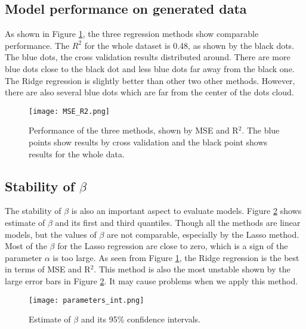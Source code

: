 \documentclass[a4paper]{article}
\begin{document}
\subsection{Model performance on generated data}
As shown in Figure \ref{figMSE_R2}, the three regression methods show comparable performance. The $R^2$ for the whole dataset is 0.48, as shown by the black dots. The blue dots, the cross validation results distributed around. There are more blue dots close to the black dot and less blue dots far away from the black one. The Ridge regression is slightly better than other two other methods. However, there are also several blue dots which are far from the center of the dots cloud.
\begin{figure}[H]
\centering
\texttt{[image: MSE\_R2.png]}
\caption{Performance of the three methods, shown by MSE and R$^{2}$. The blue points show results by cross validation and the black point shows results for the whole data.}
\label{figMSE_R2}
\end{figure}

\subsection{Stability of $\beta$}
The stability of $\beta$ is also an important aspect to evaluate models. Figure \ref{figStability} shows estimate of $\beta$ and its first and third quantiles. Though all the methods are linear models, but the values of $\beta$ are not comparable, especially by the Lasso method. Most of the $\beta$ for the Lasso regression are close to zero, which is a sign of the parameter $\alpha$ is too large. As seen from Figure \ref{figMSE_R2}, the Ridge regression is the best in terms of MSE and R$^{2}$. This method is also the most unstable shown by the large error bars in Figure \ref{figStability}. It may cause problems when we apply this method.
\begin{figure}[H]
\centering
\texttt{[image: parameters\_int.png]}\label{figParameter}
\caption{Estimate of $\beta$ and its 95\% confidence intervals.}
\label{figStability}
\end{figure}
\end{document}
